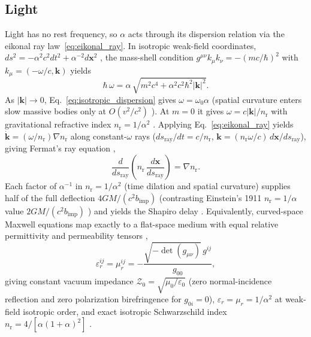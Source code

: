 \documentclass[aps,prd,onecolumn,tightenlines,nofootinbib,notitlepage,10pt,floatfix]{revtex4-2}
\theoremstyle{indentedtheorem}
\begin{document}
\subsection{Light}
\label{sec:light}

Light has no rest frequency, so $\alpha$ acts through its dispersion relation via the eikonal ray law~\eqref{eq:eikonal_ray}. In isotropic weak-field coordinates, $ds^2=-\alpha^2 c^2 dt^2+\alpha^{-2}d\mathbf{x}^2$ \citep{MTW1973Gravitation}, the mass-shell condition $g^{\mu\nu}k_\mu k_\nu=-(mc/\hbar)^2$ with $k_\mu=(-\omega/c,\mathbf{k})$ yields
\begin{equation}
    \hbar\,\omega = \alpha\,\sqrt{m^2c^4+\alpha^2c^2\hbar^2|\mathbf{k}|^2} .
    \label{eq:isotropic_dispersion}
\end{equation}
As $|\mathbf{k}|\to 0$, Eq.~\eqref{eq:isotropic_dispersion} gives $\omega=\omega_0\alpha$ (spatial curvature enters slow massive bodies only at $O(v^2/c^2)$ \citep{Gould2016Why}). At $m=0$ it gives $\omega=c|\mathbf{k}|/n_\text{r}$ with gravitational refractive index $n_\text{r}=1/\alpha^2$ \citep{Eddington1920,Gordon1923Refraction,deFelice1971Gravitational}. Applying Eq.~\eqref{eq:eikonal_ray} yields $\dot{\mathbf{k}}=(\omega/n_\text{r})\nabla n_\text{r}$ along constant-$\omega$ rays ($ds_\text{ray}/dt=c/n_\text{r}$, $\mathbf{k}=(n_\text{r}\omega/c)\,d\mathbf{x}/ds_\text{ray}$), giving Fermat's ray equation \citep{Fermat1662Refractions,Evans1986Optics},
\begin{equation}
    \frac{d}{ds_\text{ray}}\!\left(n_\text{r}\,\frac{d\mathbf{x}}{ds_\text{ray}}\right) = \nabla n_\text{r} .
    \label{eq:optical_path}
\end{equation}
Each factor of $\alpha^{-1}$ in $n_\text{r}=1/\alpha^2$ (time dilation and spatial curvature) supplies half of the full deflection $4GM/(c^2 b_\text{imp})$ (contrasting Einstein's 1911 $n_\text{r}=1/\alpha$ value $2GM/(c^2 b_\text{imp})$ \citep{Einstein1911Influence,Huygens1690Traite}) and yields the Shapiro delay \citep{Shapiro1964Fourth,Bertotti2003Test}. Equivalently, curved-space Maxwell equations map exactly to a flat-space medium with equal relative permittivity and permeability tensors \citep{Gordon1923Refraction,Plebanski1960Electromagnetic,Leonhardt2006General},
\begin{equation}
    \varepsilon_r^{ij} = \mu_r^{ij} = -\frac{\sqrt{-\det(g_{\mu\nu})}\,g^{ij}}{g_{00}} ,
    \label{eq:constitutive_map}
\end{equation}
giving constant vacuum impedance $\mathcal{Z}_0=\sqrt{\mu_0/\varepsilon_0}$ (zero normal-incidence reflection and zero polarization birefringence for $g_{0i}=0$), $\varepsilon_r=\mu_r=1/\alpha^2$ at weak-field isotropic order, and exact isotropic Schwarzschild index $n_\text{r}=4/[\alpha(1+\alpha)^2]$ \citep{MTW1973Gravitation}.
\end{document}
